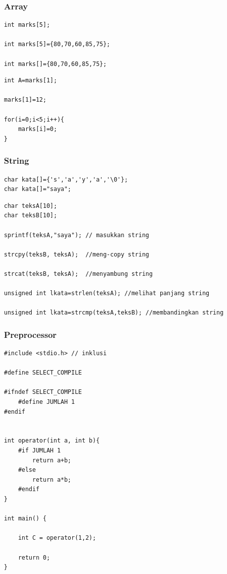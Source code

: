 \documentclass[12pt,]{article}
\begin{document}
	\subsubsection{Array}
	\begin{verbatim}
int marks[5];

int marks[5]={80,70,60,85,75};

int marks[]={80,70,60,85,75};
	\end{verbatim}
	
	\begin{verbatim}
int A=marks[1];

marks[1]=12;

for(i=0;i<5;i++){
	marks[i]=0;
}
	\end{verbatim}
	
	\subsubsection{String}
	\begin{verbatim}
char kata[]={'s','a','y','a','\0'};
char kata[]="saya";
	\end{verbatim}
	
	\begin{verbatim}
char teksA[10];
char teksB[10];

sprintf(teksA,"saya"); // masukkan string

strcpy(teksB, teksA);  //meng-copy string

strcat(teksB, teksA);  //menyambung string

unsigned int lkata=strlen(teksA); //melihat panjang string

unsigned int lkata=strcmp(teksA,teksB); //membandingkan string
	\end{verbatim}
	
	\newpage
	\subsubsection{Preprocessor}
	\begin{verbatim}
#include <stdio.h> // inklusi

#define SELECT_COMPILE

#ifndef SELECT_COMPILE
	#define JUMLAH 1
#endif


int operator(int a, int b){
	#if JUMLAH 1
		return a+b;
	#else
		return a*b;
	#endif
}

int main() {
		
	int C = operator(1,2);	
	
	return 0;
}	
	\end{verbatim}
	
\end{document}

